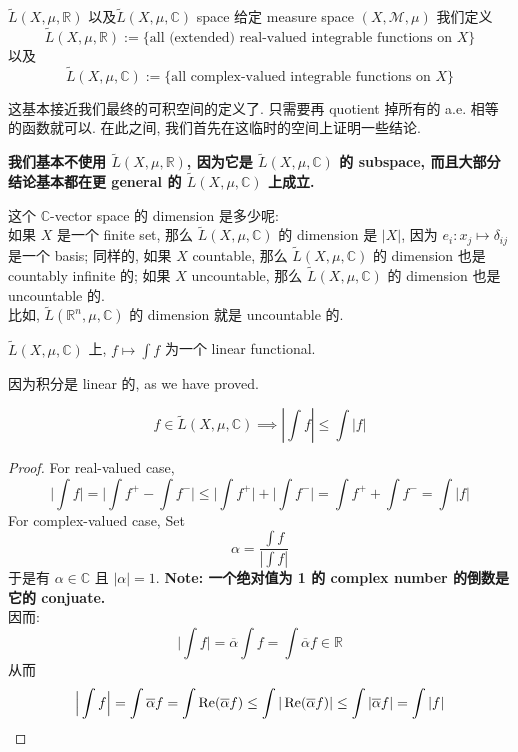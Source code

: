 \documentclass[lang=cn,11pt]{elegantbook}
\begin{document}
\begin{definition}{$\tilde{L}(X, \mu, \mathbb{R})$ 以及$\tilde{L}(X, \mu, \mathbb{C})$ space}
给定 measure space $(X, \mathcal{M},\mu)$
    我们定义 \[\tilde{L}(X,\mu, \mathbb{R}) := \{  \text{all (extended) real-valued integrable functions on } X\} \] 以及 \[\tilde{L}(X, \mu, \mathbb{C}) := \{  \text{all complex-valued integrable functions on } X\} \]
\end{definition}
\begin{remark}
    这基本接近我们最终的可积空间的定义了. 只需要再 quotient 掉所有的 a.e. 相等的函数就可以. 在此之间, 我们首先在这临时的空间上证明一些结论.

   \textbf{ 我们基本不使用 \(\tilde{L}(X,\mu, \mathbb{R})\), 因为它是 \(\tilde{L}(X,\mu, \mathbb{C})\) 的 subspace, 而且大部分结论基本都在更 general 的 \(\tilde{L}(X,\mu, \mathbb{C})\) 上成立.}
\end{remark}
\begin{remark}
    这个 $\mathbb{C}$-vector space 的 dimension 是多少呢: \\
    如果 $X$ 是一个 finite set, 那么 \(\tilde{L}(X,\mu, \mathbb{C})\)  的 dimension 是 $|X|$, 因为 $e_i : x_j \mapsto \delta_{ij}$ 是一个 basis; 同样的, 如果 $X$ countable, 那么 \(\tilde{L}(X,\mu, \mathbb{C})\) 的 dimension 也是 countably infinite 的; 如果 $X$ uncountable, 那么 \(\tilde{L}(X,\mu, \mathbb{C})\) 的 dimension 也是 uncountable 的.\\
    比如, \(\tilde{L}(\mathbb{R}^n,\mu, \mathbb{C})\) 的 dimension 就是 uncountable 的.
\end{remark}

\begin{proposition}
    \(\tilde{L}(X, \mu, \mathbb{C})\) 上, $f\mapsto \int f$ 为一个 linear functional.
\end{proposition}
因为积分是 linear 的, as we have proved.


\begin{proposition}
$$f \in \tilde{L}(X,\mu, \mathbb{C}) \implies |\int f| \leq \int |f|$$
\end{proposition}
\begin{proof}
    For real-valued case, $$ \Big| \int f  \Big| =\Big|\int f^+ - \int f^- \Big|  \leq \Big|\int f^+\Big| +  \Big|  \int f^- \Big|  = \int f^+  + \int f^- = \int |f|$$
For complex-valued case,
Set $$\alpha = \frac{\int f}{|\int f|}$$
    于是有 $\alpha \in \mathbb{C}$ 且 $|\alpha| = 1$. \textbf{Note: 一个绝对值为 1 的 complex number 的倒数是它的 conjuate.} \\
   因而:
   $$
  \Big|\int f \Big| = \overline{\alpha} \int f = \int \overline{ \alpha } f  \in \mathbb{ R}
   $$
   从而 $$ \Big| \int f \Big|  = \int \overline{\alpha} f = \int \operatorname{Re} (\overline{\alpha } f) \leq \int |\operatorname{Re} (\overline{\alpha} f)  | \leq \int |\overline{\alpha} f| = \int |f|$$
\end{proof}
\end{document}
